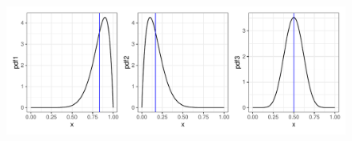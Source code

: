 \documentclass{article}\usepackage[]{graphicx}\usepackage[]{xcolor}
\begin{document}
\begin{enumerate}
\begin{enumerate}
\begin{figure}[ht]
\centering
\includegraphics[width = \linewidth]{graphs.pdf}
\end{figure}

  \end{enumerate}
\end{enumerate}

\end{document}
